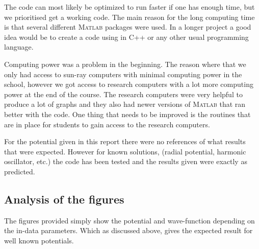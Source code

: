 \documentclass[a4paper]{article}
\begin{document}
The code can most likely be optimized to run faster if one has enough time, but we prioritised get a working code. The main reason for the long computing time is that several different \textsc{Matlab} packages were used. In a longer project a good idea would be to create a code using in C++ or any other usual programming language.


Computing power was a problem in the beginning. The reason where that we only had access to sun-ray computers with minimal computing power in the school, however we got access to research computers with a lot more computing power at the end of the course. The research computers were very helpful to produce a lot of graphs and they also had newer versions of \textsc{Matlab} that ran better with the code. One thing that needs to be improved is the routines that are in place for students to gain access to the research computers.


For the potential given in this report there were no references of what results that were expected. However for known solutions, (radial potential, harmonic oscillator, etc.) the code has been tested and the results given were exactly as predicted.

\subsection{Analysis of the figures}
The figures provided simply show the potential and wave-function depending on the in-data parameters. Which as discussed above, gives the expected result for well known potentials.
\end{document}
